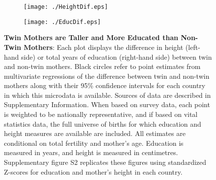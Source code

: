\documentclass{nature}
\begin{document}
\begin{linenumbers}
\begin{spacing}{1}
\begin{figure}[htpb!]
\begin{subfigure}{.5\textwidth}
  \texttt{[image: ./HeightDif.eps]}
\end{subfigure}%
\begin{subfigure}{.5\textwidth}
  \texttt{[image: ./EducDif.eps]}
\end{subfigure}
\vspace{5mm}
\caption{\textbf{Twin Mothers are Taller and More Educated than Non-Twin Mothers}: Each plot displays the difference in height (left-hand side) or total years of education (right-hand side) between twin and non-twin mothers.  Black circles refer to point estimates from multivariate regressions of the difference between twin and non-twin mothers along with their 95\% confidence intervals for each country in which this microdata is available.  Sources of data are described in Supplementary Information.  When based on survey data, each point is weighted to be nationally representative, and if based on vital statistics data, the full universe of births for which education and height measures are available are included.  All estimates are conditional on total fertility and mother's age. Education is measured in years, and height is measured in centimetres.  Supplementary figure S2 replicates these figures using standardized Z-scores for education and mother's height in each country.}
\label{fig:countryEsts}
\end{figure}



\end{spacing}
\end{linenumbers}
\end{document}
